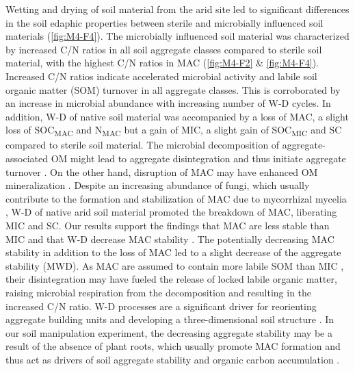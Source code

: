 Wetting and drying of soil material from the arid site led to significant differences in the soil edaphic properties between sterile and microbially influenced soil materials (\ref{fig:M4-F4}). The microbially influenced soil material was characterized by increased C/N ratios in all soil aggregate classes compared to sterile soil material, with the highest C/N ratios in MAC (\ref{fig:M4-F2} \& \ref{fig:M4-F4}). Increased C/N ratios indicate accelerated microbial activity and labile soil organic matter (SOM) turnover in all aggregate classes. This is corroborated by an increase in microbial abundance with increasing number of W-D cycles. In addition, W-D of native soil material was accompanied by a loss of MAC, a slight loss of SOC\textsubscript{MAC} and N\textsubscript{MAC} but a gain of MIC, a slight gain of SOC\textsubscript{MIC} and SC compared to sterile soil material. The microbial decomposition of aggregate-associated OM might lead to aggregate disintegration and thus initiate aggregate turnover \citep{Six2000}. On the other hand, disruption of MAC may have enhanced OM mineralization \citep{Goebel2009, Mueller2012}. Despite an increasing abundance of fungi, which usually contribute to the formation and stabilization of MAC due to mycorrhizal mycelia \citep{Chotte2005, Lehmann2017}, W-D of native arid soil material promoted the breakdown of MAC, liberating MIC and SC. Our results support the findings that MAC are less stable than MIC \citep{Six2004, Tisdall1982} and that W-D decrease MAC stability \citep{Lehrsch1991, Mulla1992, Zhang2022}. The potentially decreasing MAC stability in addition to the loss of MAC led to a slight decrease of the aggregate stability (MWD). As MAC are assumed to contain more labile SOM than MIC \citep{Elliott1986}, their disintegration may have fueled the release of locked labile organic matter, raising microbial respiration from the decomposition \citep{Najera2020} and resulting in the increased C/N ratio. W-D processes are a significant driver for reorienting aggregate building units and developing a three-dimensional soil structure \citep{Chenu2011}. In our soil manipulation experiment, the decreasing aggregate stability may be a result of the absence of plant roots, which usually promote MAC formation and thus act as drivers of soil aggregate stability and organic carbon accumulation \citep{Blankinship2016, Erktan2016, Rodriguez2024}.


